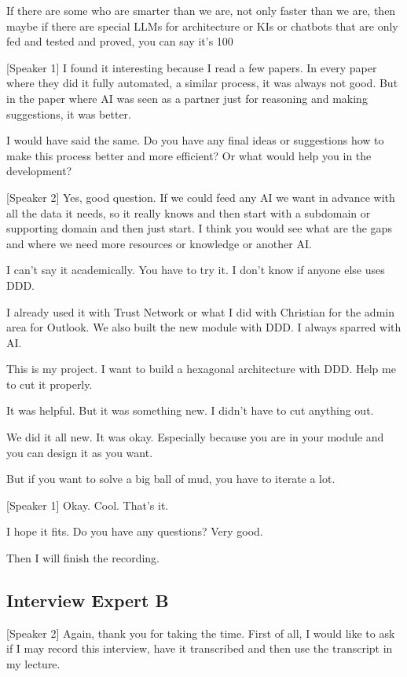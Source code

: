 If there are some who are smarter than we are, not only faster than we are, then maybe if there are special LLMs for architecture or KIs or chatbots that are only fed and tested and proved, you can say it's 100%

[Speaker 1]
I found it interesting because I read a few papers. In every paper where they did it fully automated, a similar process, it was always not good. But in the paper where AI was seen as a partner just for reasoning and making suggestions, it was better.

I would have said the same. Do you have any final ideas or suggestions how to make this process better and more efficient? Or what would help you in the development?

[Speaker 2]
Yes, good question. If we could feed any AI we want in advance with all the data it needs, so it really knows and then start with a subdomain or supporting domain and then just start. I think you would see what are the gaps and where we need more resources or knowledge or another AI.

I can't say it academically. You have to try it. I don't know if anyone else uses DDD.

I already used it with Trust Network or what I did with Christian for the admin area for Outlook. We also built the new module with DDD. I always sparred with AI.

This is my project. I want to build a hexagonal architecture with DDD. Help me to cut it properly.

It was helpful. But it was something new. I didn't have to cut anything out.

We did it all new. It was okay. Especially because you are in your module and you can design it as you want.

But if you want to solve a big ball of mud, you have to iterate a lot.

[Speaker 1]
Okay. Cool. That's it.

I hope it fits. Do you have any questions? Very good.

Then I will finish the recording.
\subsection{Interview Expert B}\label{int:a}

[Speaker 2]
Again, thank you for taking the time. First of all, I would like to ask if I may record this interview, have it transcribed and then use the transcript in my lecture.

